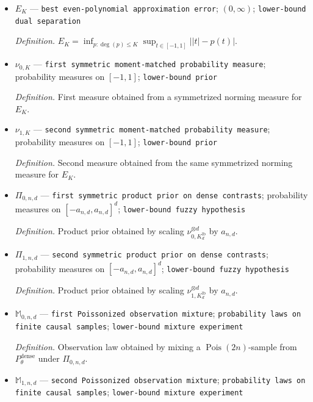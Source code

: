 \documentclass{article}
\begin{document}
\begin{itemize}
  \par\smallskip\noindent\emph{Definition.} \(a_{n,d}=\sqrt{K_d^{\mathrm{lb}}/(64\lambda_{n,d})}=\sqrt{K_d^{\mathrm{lb}}d/(128n)}\) in the dense range.
  \item \(E_K\) --- \texttt{best even-\allowbreak{}polynomial approximation error}; \((0,\infty)\); \texttt{lower-\allowbreak{}bound dual separation}
  \par\smallskip\noindent\emph{Definition.} \(E_K=\inf_{p:\deg(p)\leq K}\sup_{t\in[-1,1]}\lvert\lvert t\rvert-p(t)\rvert\).
  \item \(\nu_{0,K}\) --- \texttt{first symmetric moment-\allowbreak{}matched probability measure}; probability measures on \([-1,1]\); \texttt{lower-\allowbreak{}bound prior}
  \par\smallskip\noindent\emph{Definition.} First measure obtained from a symmetrized norming measure for \(E_K\).
  \item \(\nu_{1,K}\) --- \texttt{second symmetric moment-\allowbreak{}matched probability measure}; probability measures on \([-1,1]\); \texttt{lower-\allowbreak{}bound prior}
  \par\smallskip\noindent\emph{Definition.} Second measure obtained from the same symmetrized norming measure for \(E_K\).
  \item \(\Pi_{0,n,d}\) --- \texttt{first symmetric product prior on dense contrasts}; probability measures on \([-a_{n,d},a_{n,d}]^d\); \texttt{lower-\allowbreak{}bound fuzzy hypothesis}
  \par\smallskip\noindent\emph{Definition.} Product prior obtained by scaling \(\nu_{0,K_d^{\mathrm{lb}}}^{\otimes d}\) by \(a_{n,d}\).
  \item \(\Pi_{1,n,d}\) --- \texttt{second symmetric product prior on dense contrasts}; probability measures on \([-a_{n,d},a_{n,d}]^d\); \texttt{lower-\allowbreak{}bound fuzzy hypothesis}
  \par\smallskip\noindent\emph{Definition.} Product prior obtained by scaling \(\nu_{1,K_d^{\mathrm{lb}}}^{\otimes d}\) by \(a_{n,d}\).
  \item \(\mathbb M_{0,n,d}\) --- \texttt{first Poissonized observation mixture}; \texttt{probability laws on finite causal samples}; \texttt{lower-\allowbreak{}bound mixture experiment}
  \par\smallskip\noindent\emph{Definition.} Observation law obtained by mixing a \(\operatorname{Pois}(2n)\)-sample from \(P_\theta^{\mathrm{dense}}\) under \(\Pi_{0,n,d}\).
  \item \(\mathbb M_{1,n,d}\) --- \texttt{second Poissonized observation mixture}; \texttt{probability laws on finite causal samples}; \texttt{lower-\allowbreak{}bound mixture experiment}

\end{itemize}
\end{document}
